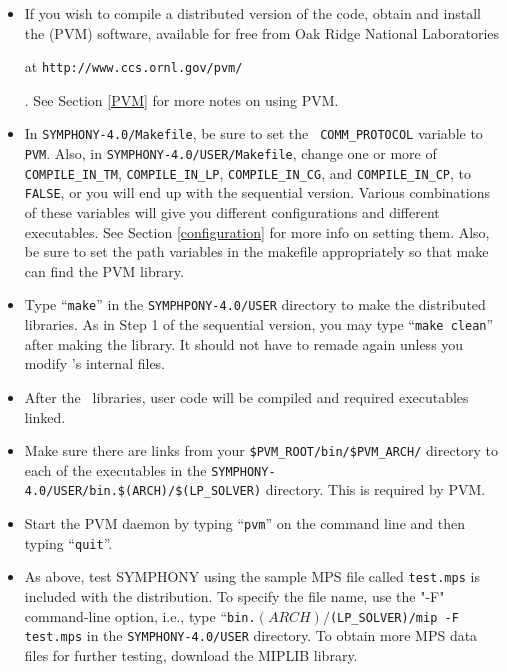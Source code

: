 \begin{itemize}
        \item If you wish to compile a distributed version of the code, obtain
and install the {\em {}} (PVM) software, available for free
from Oak Ridge National Laboratories
\begin{latexonly}
        at {\tt http://www.ccs.ornl.gov/pvm/}
\end{latexonly}. 
        See Section \ref{PVM} for more notes on using PVM.
        
        \item In \texttt{SYMPHONY-4.0/Makefile}, be sure to set the {\tt
        COMM\_PROTOCOL} variable to {\tt PVM}. Also, in
        \texttt{SYMPHONY-4.0/USER/Makefile}, change one or more of {\tt
        COMPILE\_IN\_TM}, {\tt COMPILE\_IN\_LP}, {\tt COMPILE\_IN\_CG}, and
        {\tt COMPILE\_IN\_CP}, to {\tt FALSE}, or you will end up with the
        sequential version. Various combinations of these variables will give
        you different configurations and different executables. See Section
        \ref{configuration} for more info on setting them. Also, be sure to
        set the path variables in the makefile appropriately so that make can
        find the PVM library.

        \item Type ``{\tt make}'' in the \texttt{SYMPHPONY-4.0/USER} directory to
        make the distributed libraries. As in Step 1 of the sequential
        version, you may type ``{\tt make clean}'' after making the
        library. It should not have to remade again unless you modify
        \BB's internal files.

        \item After the \BB\ libraries, user code will be compiled and
        required executables linked.

        \item Make sure there are links from your
        \texttt{\$PVM\_ROOT/bin/\$PVM\_ARCH/} directory to each of the
        executables in the
        \texttt{SYMPHONY-4.0/USER/bin.\$(ARCH)/\$(LP\_SOLVER)} directory. 
	This is required by PVM.

        \item Start the PVM daemon by typing ``{\tt pvm}'' on the command line
        and then typing ``{\tt quit}''.

        \item As above, test SYMPHONY using the sample MPS file called
        \texttt{test.mps} is included with the distribution. To specify the
        file name, use the "-F" command-line option, i.e., type
        ``\texttt{bin.$(ARCH)/$(LP\_SOLVER)/mip -F test.mps} in the
        \texttt{SYMPHONY-4.0/USER} directory. To obtain more MPS data files
        for further testing, download the MIPLIB library.

\end{itemize}


